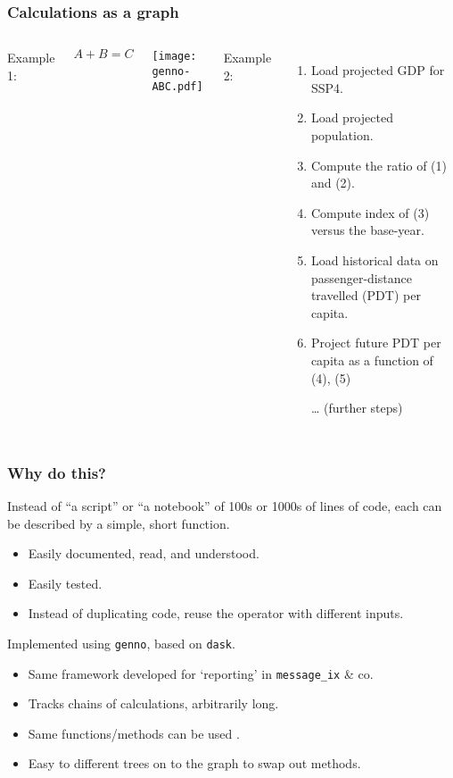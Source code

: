 \documentclass[12pt,aspectratio=169]{beamer}
\begin{document}
\begin{frame}
\frametitle{Calculations as a graph}
\begin{columns}[T]
Example 1:

\bigskip
{\LARGE $A + B = C$}

\bigskip
\texttt{[image: genno-ABC.pdf]}

Example 2:
\begin{enumerate}
  \item Load projected GDP for SSP4.
  \item Load projected population.
  \item Compute the ratio of (1) and (2).
  \item Compute index of (3) versus the base-year.
  \item Load historical data on passenger-distance travelled (PDT) per capita.
  \item Project future PDT per capita as a function of (4), (5)
  \item […] (further steps)
\end{enumerate}
\end{columns}
\end{frame}

\begin{frame}
\frametitle{Why do this?}
Instead of “a script” or “a notebook” of 100s or 1000s of lines of code, each  can be described by a simple, short function.
\begin{itemize}
  \item Easily documented, read, and understood.
  \item Easily tested.
  \item Instead of duplicating code, reuse the operator with different inputs.
\end{itemize}

\medskip
Implemented using \texttt{genno}, based on \texttt{dask}.
\begin{itemize}
  \item Same framework developed for ‘reporting’ in \texttt{message\_ix} \& co.
  \item Tracks chains of calculations, arbitrarily long.
  \item Same functions/methods can be used .
  \item Easy to  different trees on to the graph to swap out methods.
\end{itemize}
\end{frame}
\end{document}
